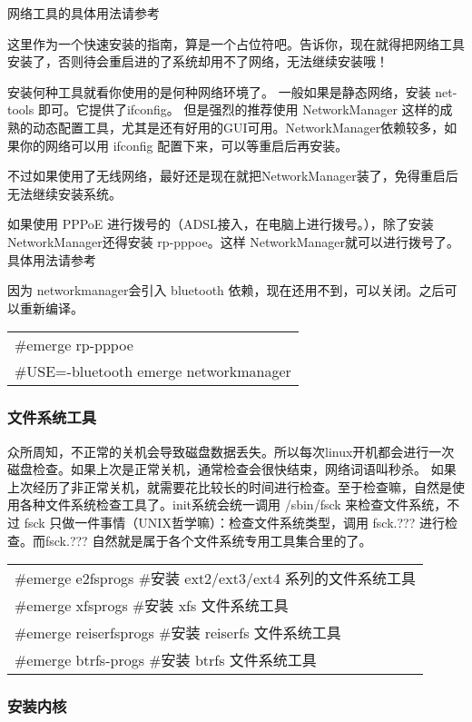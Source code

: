 \documentclass[amstex,twoside]{ctexbook}
\newenvironment{code}{\small\tt\begin{longtable}{p{0.8\textwidth}}}{\end{longtable}}
\begin{document}
网络工具的具体用法请参考 %

这里作为一个快速安装的指南，算是一个占位符吧。告诉你，现在就得把网络工具安装了，否则待会重启进的了系统却用不了网络，无法继续安装哦！

安装何种工具就看你使用的是何种网络环境了。
一般如果是静态网络，安装 net-tools 即可。它提供了ifconfig。
但是强烈的推荐使用 NetworkManager 这样的成熟的动态配置工具，尤其是还有好用的GUI可用。NetworkManager依赖较多，如果你的网络可以用 ifconfig 配置下来，可以等重启后再安装。

不过如果使用了无线网络，最好还是现在就把NetworkManager装了，免得重启后无法继续安装系统。

如果使用 PPPoE 进行拨号的（ADSL接入，在电脑上进行拨号。），除了安装NetworkManager还得安装 rp-pppoe。这样 NetworkManager就可以进行拨号了。具体用法请参考%

因为 networkmanager会引入 bluetooth 依赖，现在还用不到，可以关闭。之后可以重新编译。

\begin{code}
\#emerge rp-pppoe\\
\#USE=-bluetooth emerge networkmanager
\end{code}

\subsubsection{文件系统工具}

众所周知，不正常的关机会导致磁盘数据丢失。所以每次linux开机都会进行一次磁盘检查。如果上次是正常关机，通常检查会很快结束，网络词语叫秒杀。
如果上次经历了非正常关机，就需要花比较长的时间进行检查。至于检查嘛，自然是使用各种文件系统检查工具了。init系统会统一调用 /sbin/fsck 来检查文件系统，不过 fsck 只做一件事情（UNIX哲学嘛）：检查文件系统类型，调用 fsck.??? 进行检查。而fsck.??? 自然就是属于各个文件系统专用工具集合里的了。

\begin{code}
\#emerge e2fsprogs	\#安装 ext2/ext3/ext4 系列的文件系统工具\\
\#emerge xfsprogs	\#安装 xfs 文件系统工具\\
\#emerge reiserfsprogs	\#安装 reiserfs 文件系统工具\\
\#emerge btrfs-progs	\#安装 btrfs 文件系统工具\\
\end{code}

\subsubsection{安装内核}
\end{document}
